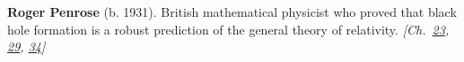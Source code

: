 \nobelphysics \textbf{Roger Penrose} (b. 1931). British mathematical physicist who proved that black hole formation is a robust prediction of the general theory of relativity. \emph{[Ch.~\hyperref[ch:blackholetimedilationredshift]{23}, \hyperref[ch:hatmonotile]{29}, \hyperref[ch:boltzmannbrain]{34}]}

